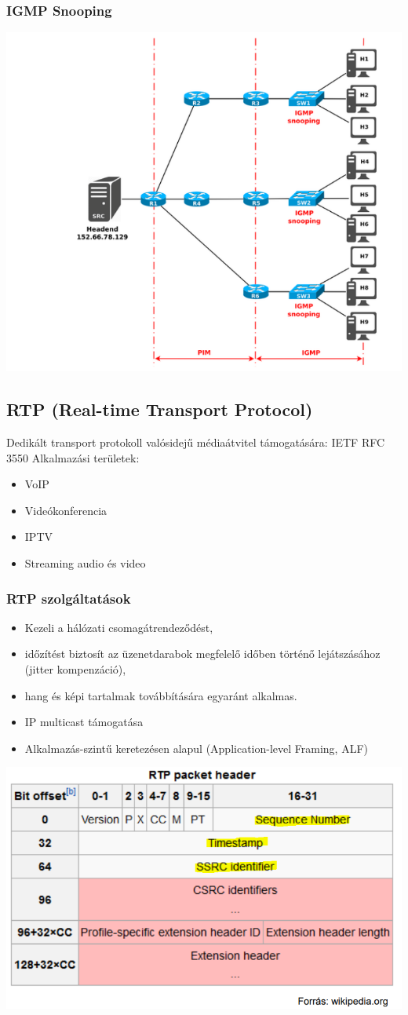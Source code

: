 \documentclass[10pt,a4paper]{article}
\begin{document}
\subsubsection{IGMP Snooping}
\begin{center}
	\includegraphics[width=0.5\linewidth]{src/IGMPsnooping}
\end{center}
\subsection{RTP (Real-time Transport Protocol)}
Dedikált transport protokoll valósidejű médiaátvitel támogatására: IETF RFC 3550
Alkalmazási területek:
\begin{itemize}
	\item VoIP
\item Videókonferencia
\item IPTV
\item Streaming audio és video
\end{itemize}
\subsubsection{RTP szolgáltatások}
\begin{itemize}
	\item Kezeli a hálózati csomagátrendeződést,
	\item időzítést biztosít az üzenetdarabok megfelelő
	időben történő lejátszásához (jitter
	kompenzáció),
	\item hang és képi tartalmak továbbítására egyaránt
	alkalmas.
	\item IP multicast támogatása
	\item Alkalmazás-szintű keretezésen alapul
	(Application-level Framing, ALF)
\end{itemize}
\begin{center}
	\includegraphics[width=0.5\linewidth]{src/RTPheader}
\end{center}
\end{document}
